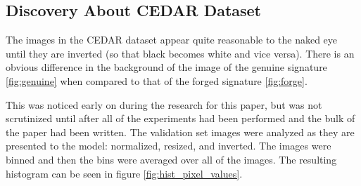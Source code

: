 






\subsection{Discovery About CEDAR Dataset}\label{sec:cedar_flaw}
The images in the CEDAR dataset appear quite reasonable to the naked eye until they are inverted (so that black becomes white and vice versa).
There is an obvious difference in the background of the image of the genuine signature \ref{fig:genuine} when compared to that of the forged signature \ref{fig:forge}.

This was noticed early on during the research for this paper, but was not scrutinized until after all of the experiments had been performed and the bulk of the paper had been written.
The validation set images were analyzed as they are presented to the model: normalized, resized, and inverted.
The images were binned and then the bins were averaged over all of the images.
The resulting histogram can be seen in figure \ref{fig:hist_pixel_values}.

